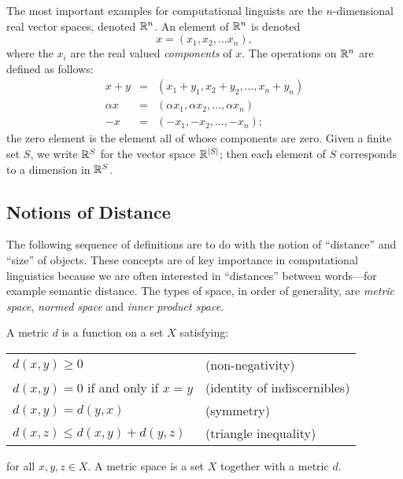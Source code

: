 \begin{defn}
The most important examples for computational linguists are the $n$-dimensional real vector spaces, denoted $\mathbb{R}^n$. An element of $\mathbb{R}^n$ is denoted
$$x = (x_1,x_2,\ldots x_n),$$
where the $x_i$ are the real valued \emph{components} of $x$. The operations on $\mathbb{R}^n$ are defined as follows:
\begin{eqnarray*}
x + y & = & (x_1 + y_1, x_2 + y_2, \ldots, x_n + y_n)\\
\alpha x & = & (\alpha x_1, \alpha x_2, \ldots, \alpha x_n)\\
-x & = & (-x_1, -x_2, \ldots, -x_n);
\end{eqnarray*}
the zero element is the element all of whose components are zero.
Given a finite set $S$, we write $\mathbb{R}^S$ for the vector space $\mathbb{R}^{|S|}$; then each element of $S$ corresponds to a dimension in $\mathbb{R}^S$.
\end{defn}

\subsection{Notions of Distance}

The following sequence of definitions are to do with the notion of ``distance'' and ``size'' of objects. These concepts are of key importance in computational linguistics because we are often interested in ``distances'' between words---for example semantic distance. The types of space, in order of generality, are \emph{metric space}, \emph{normed space} and \emph{inner product space}.
\begin{defn}[Metric]
A metric $d$ is a function on a set $X$ satisfying:
\begin{center}
\begin{tabular}{ll}
$d(x,y) \ge 0$ & (non-negativity)\\
$d(x,y) = 0$ if and only if $x=y$ & (identity of indiscernibles)\\
$d(x,y) = d(y,x)$ & (symmetry)\\
$d(x,z) \le d(x,y) + d(y,z)$ & (triangle inequality)
\end{tabular}
\end{center}
for all $x,y,z \in X$. A metric space is a set $X$ together with a metric $d$.
\end{defn}

